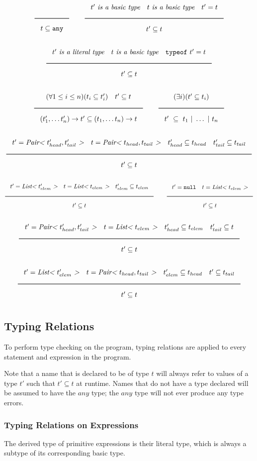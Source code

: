 \noindent
\[
\Rule{}{t \subseteq \Any}
\qquad
\Rule{t'\ \textit{is a basic type} \quad t\ \textit{is a basic type} \quad t' = t}{t' \subseteq t}
\]
\noindent
\[
\Rule{t'\ \textit{is a literal type} \quad t\ \textit{is a basic type} \quad \texttt{typeof}\ t' = t}{t' \subseteq t}
\]
\noindent
\[
\Rule{(\forall 1 \leq i \leq n)(t_i \subseteq t'_i) \quad t' \subseteq t}{(t'_1, \ldots t'_n) \rightarrow t' \subseteq (t_1, \ldots t_n) \rightarrow t}
\qquad
\Rule{(\exists i)(t' \subseteq t_i)}{t'\ \subseteq\ t_1\ |\ \ldots\ |\ t_n}
\]
\noindent
\[
\Rule{t' = \textit{Pair<}\ t'_{head}, t'_{tail}\ \textit{>} \quad t = \textit{Pair<}\ t_{head}, t_{tail}\ \textit{>}
  \quad t'_{head} \subseteq t_{head} \quad t'_{tail} \subseteq t_{tail}}{t' \subseteq t}
\]
\noindent
\[
\Rule{t' = \textit{List<}\ t'_{elem}\ \textit{>} \quad t = \textit{List<}\ t_{elem}\ \textit{>}
  \quad t'_{elem} \subseteq t_{elem}}{t' \subseteq t}
\qquad
\Rule{t' = \Null \quad t = \textit{List<}\ t_{elem}\ \textit{>}}{t' \subseteq t}
\]
\noindent
\[
\Rule{t' = \textit{Pair<}\ t'_{head}, t'_{tail}\ \textit{>} \quad t = \textit{List<}\ t_{elem}\ \textit{>}
  \quad t'_{head} \subseteq t_{elem} \quad t'_{tail} \subseteq t}{t' \subseteq t}
\]
\noindent
\[
\Rule{t' = \textit{List<}\ t'_{elem}\ \textit{>} \quad t = \textit{Pair<}\ t_{head}, t_{tail}\ \textit{>}
  \quad t'_{elem} \subseteq t_{head} \quad t' \subseteq t_{tail}}{t' \subseteq t}
\]
\noindent

\subsection{Typing Relations}
\label{typing-rules}

To perform type checking on the program, typing relations are applied to every statement and expression in the program.

Note that a name that is declared to be of type $t$ will always refer to values of a type $t'$ such that $t' \subseteq t$ at runtime.
Names that do not have a type declared will be assumed to have the $any$ type; the $any$ type will not ever produce any type errors.

\subsubsection{Typing Relations on Expressions}

The derived type of primitive expressions is their literal type, which is always a subtype of its corresponding basic type.


